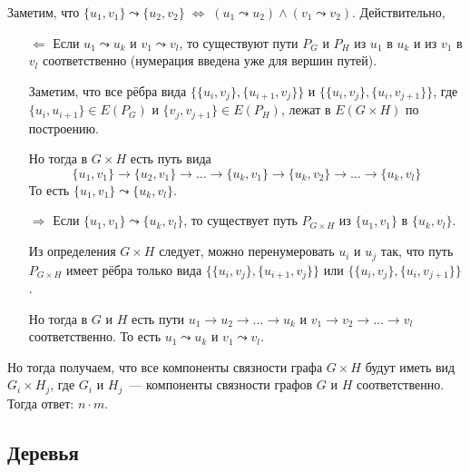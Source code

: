 \begin{Answer}
    \noindent
    Заметим, что $ \{ u_1, v_1 \} \leadsto \{ u_2, v_2 \} \; \Longleftrightarrow \; (u_1 \leadsto u_2) \wedge (v_1 \leadsto v_2) $.
    \newline
    Действительно,
    \begin{enumerate}
        \item[$ \Leftarrow $]
            Если $ u_1 \leadsto u_k $ и $ v_1 \leadsto v_l $, то существуют пути $ P_G $ и $ P_H $ из $ u_1 $ в $ u_k $ и из $ v_1 $ в $ v_l $ соответственно
            (нумерация введена уже для вершин путей).

            Заметим, что все рёбра вида $ \big \{ \{u_i, v_j\}, \{u_{i+1}, v_j\} \big \} $ и $ \big \{ \{u_i, v_j\}, \{u_i, v_{j+1}\} \big \} $,
            где $ \{ u_i, u_{i+1} \} \in E(P_G) $ и $ \{ v_j, v_{j+1} \} \in E(P_H) $,
            лежат в $ E(G \times H) $ по построению.

            Но тогда в $ G \times H $ есть путь вида
            \[
                \{ u_1, v_1 \} \to \{ u_2, v_1 \} \to \ldots \to \{ u_k, v_1 \} \to \{ u_k, v_2 \} \to \ldots \to \{ u_k, v_l \}
            \]
            То есть $ \{ u_1, v_1 \} \leadsto \{ u_k, v_l \} $.
        \item[$ \Rightarrow $]
            Если $ \{ u_1, v_1 \} \leadsto \{ u_k, v_l \} $, то существует путь $ P_{G \times H} $ из $  \{ u_1, v_1 \} $ в $ \{ u_k, v_l \} $.

            Из определения $ G \times H $ следует, можно перенумеровать $ u_i $ и $ u_j $ так, что путь $ P_{G \times H} $ имеет рёбра только вида
            $ \big \{ \{u_i, v_j\}, \{u_{i+1}, v_j\} \big \} $ или $ \big \{ \{u_i, v_j\}, \{u_i, v_{j+1}\} \big \} $.

            Но тогда в $ G $ и $ H $ есть пути $ u_1 \to u_2 \to \ldots \to u_k $ и $ v_1 \to v_2 \to \ldots \to v_l $ соответственно.
            То есть $ u_1 \leadsto u_k $ и $ v_1 \leadsto v_l $.
    \end{enumerate}
    Но тогда получаем, что все компоненты связности графа $ G \times H $ будут иметь вид $ G_i \times H_j $,
    где $ G_i $ и $ H_j $~--- компоненты связности графов $ G $ и $ H $ соответственно.
    Тогда ответ: $ n \cdot m $.
\end{Answer}



\subsection{Деревья}
\label{subsec:graphs:trees}

